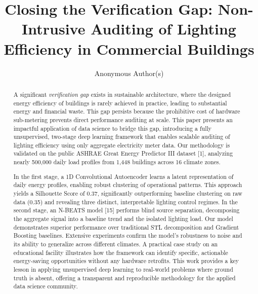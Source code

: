 \documentclass{svproc}
\begin{document}
\mainmatter

\title{Closing the Verification Gap: Non-Intrusive Auditing of Lighting Efficiency in Commercial Buildings}

\author{Anonymous Author(s)}

\maketitle

\begin{abstract}
A significant \textit{verification gap} exists in sustainable architecture, where the designed energy efficiency of buildings is rarely achieved in practice, leading to substantial energy and financial waste. This gap persists because the prohibitive cost of hardware sub-metering prevents direct performance auditing at scale. This paper presents an impactful application of data science to bridge this gap, introducing a fully unsupervised, two-stage deep learning framework that enables scalable auditing of lighting efficiency using only aggregate electricity meter data. Our methodology is validated on the public ASHRAE Great Energy Predictor III dataset [1], analyzing nearly 500,000 daily load profiles from 1,448 buildings across 16 climate zones.

In the first stage, a 1D Convolutional Autoencoder learns a latent representation of daily energy profiles, enabling robust clustering of operational patterns. This approach yields a Silhouette Score of 0.37, significantly outperforming baseline clustering on raw data (0.35) and revealing three distinct, interpretable lighting control regimes. In the second stage, an N-BEATS model [15] performs blind source separation, decomposing the aggregate signal into a baseline trend and the isolated lighting load. Our model demonstrates superior performance over traditional STL decomposition and Gradient Boosting baselines. Extensive experiments confirm the model's robustness to noise and its ability to generalize across different climates. A practical case study on an educational facility illustrates how the framework can identify specific, actionable energy-saving opportunities without any hardware retrofits. This work provides a key lesson in applying unsupervised deep learning to real-world problems where ground truth is absent, offering a transparent and reproducible methodology for the applied data science community.

\end{abstract}






\end{document}
